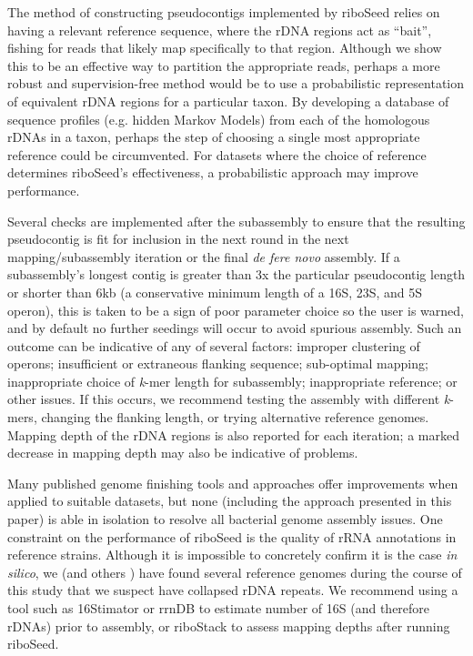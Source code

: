 \documentclass[a4,center,fleqn]{NAR}
\begin{document}
The method of constructing pseudocontigs implemented by riboSeed relies on having a relevant reference sequence, where the rDNA regions act as ``bait'', fishing for reads that likely map specifically to that region. Although we show this to be an effective way to partition the appropriate reads, perhaps a more robust and supervision-free method would be to use a probabilistic representation of equivalent rDNA regions for a particular taxon. By developing a database of sequence profiles (e.g. hidden Markov Models) from each of the homologous rDNAs in a taxon, perhaps the step of choosing a single most appropriate reference could be circumvented. For datasets where the choice of reference determines riboSeed's effectiveness, a probabilistic approach may improve performance.

Several checks are implemented after the subassembly to ensure that the resulting pseudocontig is fit for inclusion in the next round in the next mapping/subassembly iteration or the final \textit{de fere novo} assembly. If a subassembly's longest contig is greater than 3x the particular pseudocontig length or shorter than 6kb (a conservative minimum length of a 16S, 23S, and 5S operon), this is taken to be a sign of poor parameter choice so the user is warned, and by default no further seedings will occur to avoid spurious assembly. Such an outcome can be indicative of any of several factors: improper clustering of operons; insufficient or extraneous flanking sequence; sub-optimal mapping; inappropriate choice of \textit{k}-mer length for subassembly; inappropriate reference; or other issues. If this occurs, we recommend testing the assembly with different \textit{k}-mers, changing the flanking length, or trying alternative reference genomes. Mapping depth of the rDNA regions is also reported for each iteration; a marked decrease in mapping depth may also be indicative of problems.

Many published genome finishing tools and approaches offer improvements when applied to suitable datasets, but none (including the approach presented in this paper) is able in isolation to resolve all bacterial genome assembly issues. One constraint on the performance of riboSeed is the quality of rRNA annotations in reference strains. Although it is impossible to concretely confirm it is the case \textit{in silico}, we (and others \cite{Mariano2016}) have found several reference genomes during the course of this study that we suspect have collapsed rDNA repeats. We recommend using a tool such as 16Stimator\cite{Perisin2016} or rrnDB\cite{Stoddard2014} to estimate number of 16S (and therefore rDNAs) prior to assembly, or riboStack to assess mapping depths after running riboSeed.
\end{document}
